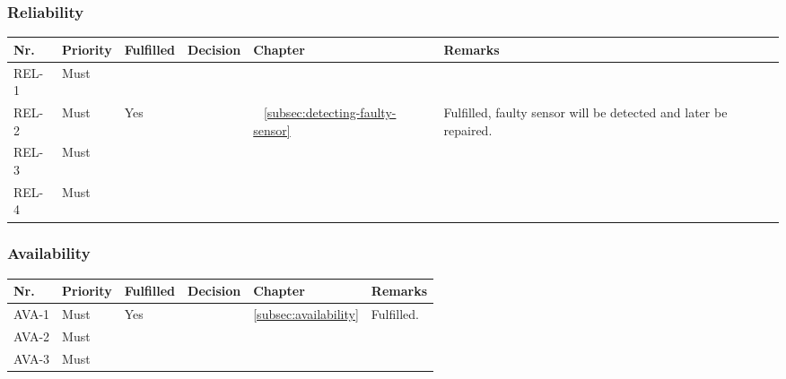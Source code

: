 	\subsubsection{Reliability}
	\begin{table}[H]
	\begin{tabular}{lllllL{}}
	
	Nr.   & Priority & Fulfilled & Decision & Chapter & Remarks \\ \hline
	
	REL-1 & Must     & ~        & ~ & ~         & ~       \\ \hline
	
	REL-2 & Must     & Yes      & ~ & ~    \ref{subsec:detecting-faulty-sensor}     & Fulfilled, faulty sensor will be detected and later be repaired.       \\ \hline
	
	REL-3 & Must     & ~        & ~ & ~         & ~       \\ \hline
	
	REL-4 & Must     & ~        & ~ & ~         & ~       \\ \hline
	
	\end{tabular}
	\end{table}
	
	\subsubsection{Availability}
	\begin{table}[H]
	\begin{tabular}{lllllL{}}
	
	Nr.   & Priority & Fulfilled & Decision & Chapter & Remarks \\ \hline
	
	AVA-1 & Must     & Yes      & & \ref{subsec:availability}         & Fulfilled.       \\ \hline
	AVA-2 & Must     & ~        & & ~         & ~       \\ \hline
	AVA-3 & Must     & ~        & & ~         & ~       \\ \hline
	
	\end{tabular}
	\end{table}
	
